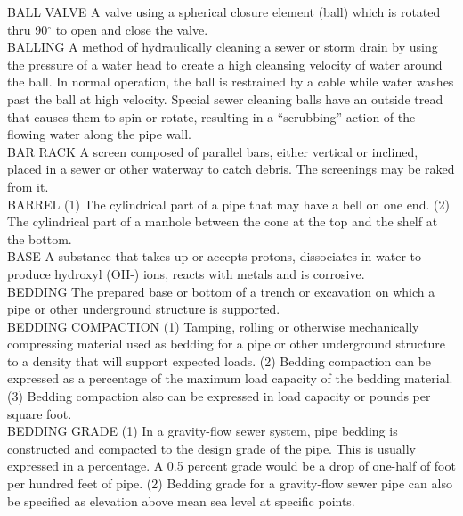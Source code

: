 BALL VALVE
A valve using a spherical closure element (ball) which is rotated thru 90$^{\circ}$ to open and close the valve.
\vspace{0.3cm}\\
BALLING
A method of hydraulically cleaning a sewer or storm drain by using the pressure of a water head to create a high cleansing velocity of water around the ball. In normal operation, the ball is restrained by a cable while water washes past the ball at high velocity. Special sewer cleaning balls have an outside tread that causes them to spin or rotate, resulting in a “scrubbing” action of the flowing water along the pipe wall. 
\vspace{0.3cm}\\
BAR RACK
A screen composed of parallel bars, either vertical or inclined, placed in a sewer or other waterway to catch debris. The screenings may be raked from it. 
\vspace{0.3cm}\\
BARREL
(1) The cylindrical part of a pipe that may have a bell on one end. (2) The cylindrical part of a manhole between the cone at the top and the shelf at the bottom. 
\vspace{0.3cm}\\
BASE
A substance that takes up or accepts protons, dissociates in water to produce hydroxyl (OH-) ions, reacts with metals and is corrosive.
\vspace{0.3cm}\\
BEDDING
The prepared base or bottom of a trench or excavation on which a pipe or other underground structure is supported. 
\vspace{0.3cm}\\
BEDDING COMPACTION
(1) Tamping, rolling or otherwise mechanically compressing material used as bedding for a pipe or other underground structure to a density that will support expected loads. (2) Bedding compaction can be expressed as a percentage of the maximum load capacity of the bedding material. (3) Bedding compaction also can be expressed in load capacity or pounds per square foot. 
\vspace{0.3cm}\\
BEDDING GRADE
(1) In a gravity-flow sewer system, pipe bedding is constructed and compacted to the design grade of the pipe. This is usually expressed in a percentage. A 0.5 percent grade would be a drop of one-half of foot per hundred feet of pipe. (2) Bedding grade for a gravity-flow sewer pipe can also be specified as elevation above mean sea level at specific points. 
